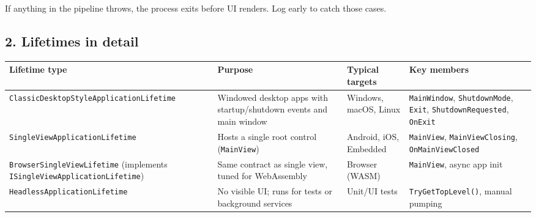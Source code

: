 If anything in the pipeline throws, the process exits before UI renders.
Log early to catch those cases.

\subsection{2. Lifetimes in detail}\label{lifetimes-in-detail}

\begin{longtable}[]{@{}
  >{\raggedright\arraybackslash}p{}
  >{\raggedright\arraybackslash}p{}
  >{\raggedright\arraybackslash}p{}
  >{\raggedright\arraybackslash}p{}@{}}
\toprule\noalign{}
\begin{minipage}[b]{\linewidth}\raggedright
Lifetime type
\end{minipage} & \begin{minipage}[b]{\linewidth}\raggedright
Purpose
\end{minipage} & \begin{minipage}[b]{\linewidth}\raggedright
Typical targets
\end{minipage} & \begin{minipage}[b]{\linewidth}\raggedright
Key members
\end{minipage} \\
\midrule\noalign{}
\endhead
\bottomrule\noalign{}
\endlastfoot
\passthrough{\lstinline!ClassicDesktopStyleApplicationLifetime!} &
Windowed desktop apps with startup/shutdown events and main window &
Windows, macOS, Linux & \passthrough{\lstinline!MainWindow!},
\passthrough{\lstinline!ShutdownMode!}, \passthrough{\lstinline!Exit!},
\passthrough{\lstinline!ShutdownRequested!},
\passthrough{\lstinline!OnExit!} \\
\passthrough{\lstinline!SingleViewApplicationLifetime!} & Hosts a single
root control (\passthrough{\lstinline!MainView!}) & Android, iOS,
Embedded & \passthrough{\lstinline!MainView!},
\passthrough{\lstinline!MainViewClosing!},
\passthrough{\lstinline!OnMainViewClosed!} \\
\passthrough{\lstinline!BrowserSingleViewLifetime!} (implements
\passthrough{\lstinline!ISingleViewApplicationLifetime!}) & Same
contract as single view, tuned for WebAssembly & Browser (WASM) &
\passthrough{\lstinline!MainView!}, async app init \\
\passthrough{\lstinline!HeadlessApplicationLifetime!} & No visible UI;
runs for tests or background services & Unit/UI tests &
\passthrough{\lstinline!TryGetTopLevel()!}, manual pumping \\
\end{longtable}

